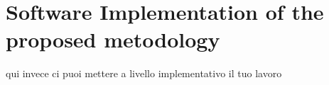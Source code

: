 
\chapter[Software Implementation]{Software Implementation of the proposed  metodology}\label{chap6:SW_IMP_MET}


qui invece ci puoi mettere a livello implementativo il tuo lavoro 
